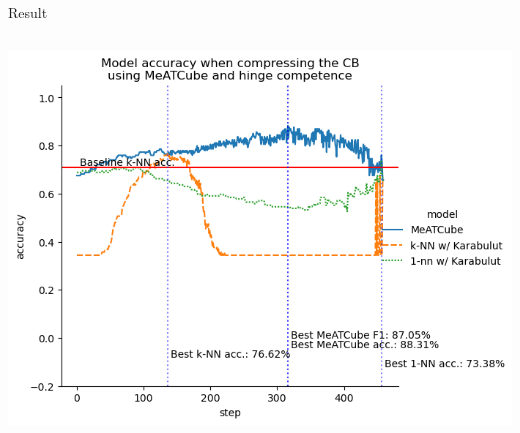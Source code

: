 \documentclass[]{beamer}
\begin{document}
\begin{frame}{Result}
\begin{columns}
\begin{column}{.65\textwidth}
            \includegraphics[width=.8\textwidth]{../results-weight-estim+/figs/kaggle+pima+indian+diabetes.png}
        \end{column}
    \end{columns}
\end{frame}
\end{document}
